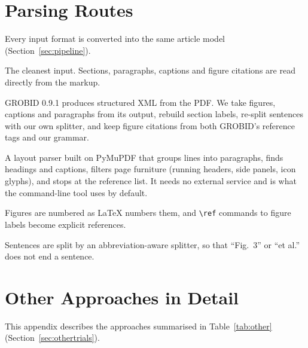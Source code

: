 \section{Parsing Routes}
\label{app:parsing}
Every input format is converted into the same article model (Section~\ref{sec:pipeline}).
\begin{description}[leftmargin=1.2em,style=nextline,itemsep=3pt]
  \item[Structured XML (JATS)] The cleanest input. Sections, paragraphs, captions and figure citations are
        read directly from the markup.
  \item[PDF through GROBID] GROBID 0.9.1 \citep{lopez2009grobid} produces structured XML from the PDF. We take
        figures, captions and paragraphs from its output, rebuild section labels, re-split sentences with our
        own splitter, and keep figure citations from both GROBID's reference tags and our grammar.
  \item[PDF through our own parser] A layout parser built on PyMuPDF that groups lines into paragraphs, finds
        headings and captions, filters page furniture (running headers, side panels, icon glyphs), and stops at
        the reference list. It needs no external service and is what the command-line tool uses by default.
  \item[\LaTeX{} source] Figures are numbered as \LaTeX{} numbers them, and \verb|\ref| commands to figure
        labels become explicit references.
\end{description}
Sentences are split by an abbreviation-aware splitter, so that ``Fig.~3'' or ``et al.'' does not end a
sentence.

\section{Other Approaches in Detail}
\label{app:other}
This appendix describes the approaches summarised in Table~\ref{tab:other} (Section~\ref{sec:othertrials}).

